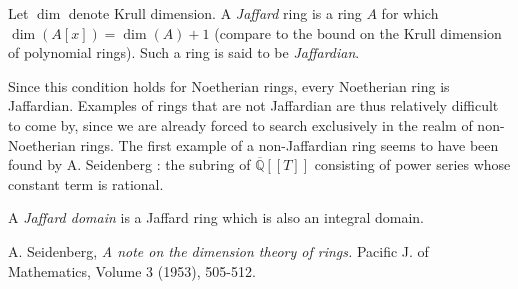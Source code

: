 \documentclass[12pt]{article}
\newcommand{\ol}{\overline}
\newcommand{\<}{\langle}
\renewcommand{\>}{\rangle}
\begin{document}
Let $\operatorname{dim}$ denote Krull dimension.  A \emph{Jaffard} ring is a ring $A$ for which $\operatorname{dim}(A[x])=\operatorname{dim}(A)+1$ (compare to the bound on the Krull dimension of polynomial rings).  Such a ring is said to be \emph{Jaffardian}.

Since this condition holds for Noetherian rings, every Noetherian ring is Jaffardian.  Examples of rings that are not Jaffardian are thus relatively difficult to come by, since we are already forced to search exclusively in the realm of non-Noetherian rings.  The first example of a non-Jaffardian ring seems to have been found by A. Seidenberg \cite{Seid}:  the subring of $\ol{\mathbb{Q}}[[T]]$ consisting of power series whose constant term is rational.

A \emph{Jaffard domain} is a Jaffard ring which is also an integral domain.

\begin{thebibliography}{9}
 A. Seidenberg, \emph{A note on the dimension theory of rings.} Pacific J. of Mathematics, Volume 3 (1953), 505-512.
\end{thebibliography}
\end{document}
